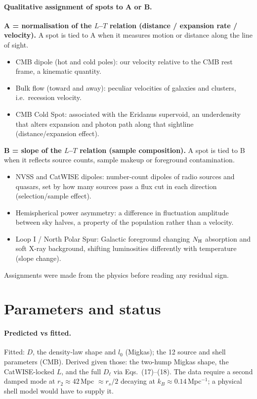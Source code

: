 \documentclass[10pt,twocolumn]{article}
\begin{document}
\paragraph{Qualitative assignment of spots to A or B.}
\textbf{A = normalisation of the $L$--$T$ relation (distance / expansion rate / velocity).} A spot is tied to A when it measures motion or distance along the line of sight.
\begin{itemize}\setlength\itemsep{0pt}
\item CMB dipole (hot and cold poles): our velocity relative to the CMB rest frame, a kinematic quantity.
\item Bulk flow (toward and away): peculiar velocities of galaxies and clusters, i.e.\ recession velocity.
\item CMB Cold Spot: associated with the Eridanus supervoid, an underdensity that alters expansion and photon path along that sightline (distance/expansion effect).
\end{itemize}
\textbf{B = slope of the $L$--$T$ relation (sample composition).} A spot is tied to B when it reflects source counts, sample makeup or foreground contamination.
\begin{itemize}\setlength\itemsep{0pt}
\item NVSS and CatWISE dipoles: number-count dipoles of radio sources and quasars, set by how many sources pass a flux cut in each direction (selection/sample effect).
\item Hemispherical power asymmetry: a difference in fluctuation amplitude between sky halves, a property of the population rather than a velocity.
\item Loop I / North Polar Spur: Galactic foreground changing $N_{\rm H}$ absorption and soft X-ray background, shifting luminosities differently with temperature (slope change).
\end{itemize}
Assignments were made from the physics before reading any residual sign.

\section{Parameters and status}

\paragraph{Predicted vs fitted.} Fitted: $D$, the density-law shape and $l_0$ (Migkas); the 12 source and shell parameters (CMB). Derived given those: the two-hump Migkas shape, the CatWISE-locked $L$, and the full $D_\ell$ via Eqs.~(17)--(18). The data require a second damped mode at $r_2\approx42$\,Mpc $\approx r_s/2$ decaying at $k_B\approx0.14$\,Mpc$^{-1}$; a physical shell model would have to supply it.
\end{document}
